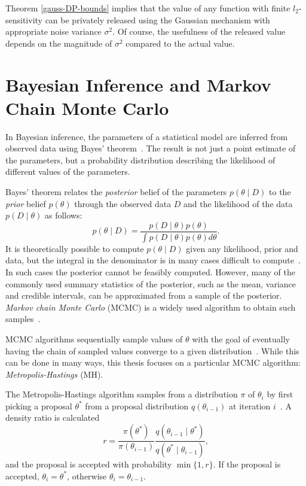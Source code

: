 \documentclass[english,twoside,openright]{HYgraduMLDS}
\begin{document}
Theorem \ref{gauss-DP-bounds} implies that the value of any function with 
finite \(l_2\)-sensitivity can be privately released using the Gaussian mechanism 
with appropriate noise variance \(\sigma^2\). Of course, the usefulness of the 
released value depends on the magnitude of \(\sigma^2\) compared to the actual 
value.

\section{Bayesian Inference and Markov Chain Monte Carlo}\label{MCMC_background}

In Bayesian inference, the parameters of a statistical model are inferred from 
observed data using Bayes' theorem~\cite{BDA}. The result is not just a point estimate 
of the parameters, but a probability distribution describing the likelihood 
of different values of the parameters.

Bayes' theorem relates the \emph{posterior} belief of the parameters 
\(p(\theta \mid D)\) to the \emph{prior} belief \(p(\theta)\) through the 
observed data \(D\) and the likelihood of the data \(p(D\mid \theta)\) as follows:
\[
    p(\theta \mid D) = \frac{p(D \mid \theta)p(\theta)}
    {\int p(D\mid \theta)p(\theta)d\theta}.
\]
It is theoretically possible to compute \(p(\theta \mid D)\) given any 
likelihood, prior and data, but the integral in the denominator is in many 
cases difficult to compute~\cite{BDA}. In such cases the posterior cannot be feasibly 
computed. However, many of the commonly used summary statistics of the posterior, 
such as the mean, variance and credible intervals, can be approximated from 
a sample of the posterior. \emph{Markov chain Monte Carlo} (MCMC) is a 
widely used algorithm to obtain such samples~\cite{BDA}.

MCMC algorithms sequentially sample values of \(\theta\)
with the goal of eventually having the chain of sampled values converge to 
a given distribution~\cite{BDA}. While this can be done in many ways, this thesis 
focuses on a particular MCMC algorithm: \emph{Metropolis-Hastings} (MH).

The Metropolis-Hastings algorithm samples from a distribution \(\pi\) of 
\(\theta_i\) by first picking a proposal \(\theta^*\) from a proposal 
distribution \(q(\theta_{i-1})\) at iteration \(i\)~\cite{BDA}.
A density ratio is calculated
\[
    r = \frac{\pi(\theta^*)}{\pi(\theta_{i-1})}
    \frac{q(\theta_{i-1}\mid \theta^*)}{q(\theta^*\mid \theta_{i-1})},
\]
and the proposal is accepted with probability \(\min\{1, r\}\). 
If the proposal is accepted, 
\(\theta_i = \theta^*\), otherwise \(\theta_i = \theta_{i-1}\).
\end{document}
